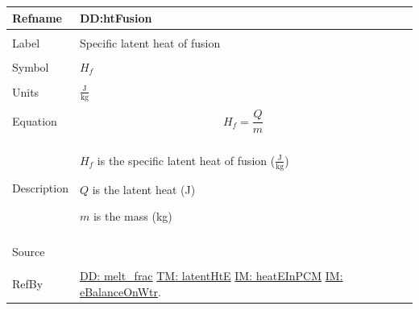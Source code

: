 \documentclass[12pt]{article}
\begin{document}
\noindent \begin{minipage}{\textwidth}
\begin{tabular}{p{} p{}}
\toprule \textbf{Refname} & \textbf{DD:htFusion}
\label{DD:htFusion}
\\ \midrule \\
Label & Specific latent heat of fusion
\\ \midrule \\
Symbol & ${H_{f}}$
\\ \midrule \\
Units & $\frac{\text{J}}{\text{kg}}$
\\ \midrule \\
Equation & \begin{displaymath}
           {H_{f}}=\frac{Q}{m}
           \end{displaymath}
\\ \midrule \\
Description & \begin{symbDescription}
              \item{${H_{f}}$ is the specific latent heat of fusion ($\frac{\text{J}}{\text{kg}}$)}
              \item{$Q$ is the latent heat (J)}
              \item{$m$ is the mass (kg)}
              \end{symbDescription}
\\ \midrule \\
Source & \cite[(pg. 282)]{bueche1986}
\\ \midrule \\
RefBy & \hyperref[DD:melt.frac]{DD: melt\_frac} \hyperref[TM:latentHtE]{TM: latentHtE} \hyperref[IM:heatEInPCM]{IM: heatEInPCM} \hyperref[IM:eBalanceOnWtr]{IM: eBalanceOnWtr}.
\\ \bottomrule \end{tabular}
\end{minipage}
\par~
\end{document}
